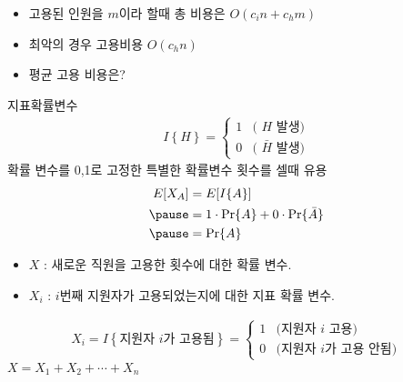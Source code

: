 \documentclass[10pt]{beamer}
\begin{document}
\begin{frame}{}
    \begin{itemize}
        \item 고용된 인원을 $m$이라 할때 총 비용은 $O(c_in + c_hm)$
        \item 최악의 경우 고용비용
        \pause
        $O(c_hn)$
        \item 평균 고용 비용은?
    \end{itemize}
\end{frame}


\begin{frame}{지표확률변수}
    \begin{align*}
        I\left\{ H \right\} =  
    \begin{cases}
        1 &\mbox{( $H$ 발생)} \\
        0 &\mbox{( $\bar{H}$ 발생)}
    \end{cases}   
    \end{align*}
    확률 변수를 0,1로 고정한 특별한 확률변수 횟수를 셀때 유용
    \pause
    \[
        \begin{aligned}
        E[X_A] &= E[I\{A\}] \\  \pause
            &=1 \cdot \Pr\{A\} + 0 \cdot \Pr\{\bar{A}\}\\ \pause
            &= \Pr\{A\}        
        \end{aligned}
    \]
\end{frame}



\begin{frame}{}
    \begin{itemize}
        \item $X$ : 새로운 직원을 고용한 횟수에 대한 확률 변수.\pause
        \item $X_i$ : $i$번째 지원자가 고용되었는지에 대한 지표 확률 변수.\pause
    \end{itemize}

    \begin{align*}
       X_i  = I\left\{ \mbox{지원자 $i$가 고용됨} \right\} =  
    \begin{cases}
        1 &\mbox{(지원자 $i$ 고용)} \\
        0 &\mbox{(지원자 $i$가 고용 안됨)}
    \end{cases}    
    \end{align*}
    \pause
    $X = X_1 + X_2 + \cdots + X_n$
\end{frame}
\end{document}

